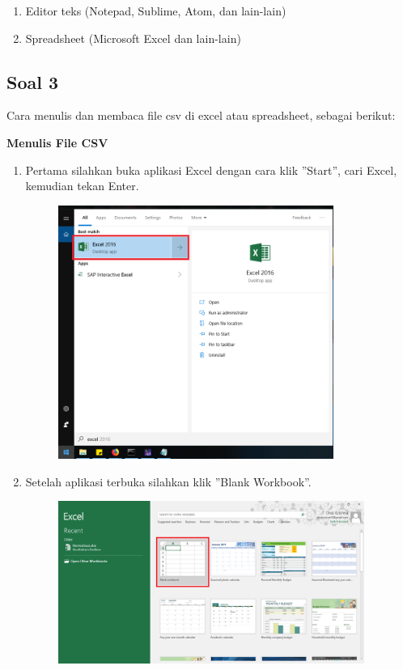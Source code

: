 \begin{enumerate}
	\item Editor teks (Notepad, Sublime, Atom, dan lain-lain)
	\item Spreadsheet (Microsoft Excel dan lain-lain)
\end{enumerate}

\subsection{Soal 3}
Cara menulis dan membaca file csv di excel atau spreadsheet, sebagai berikut:

\textbf{Menulis File CSV}

\begin{enumerate}
	\item Pertama silahkan buka aplikasi Excel dengan cara klik ''Start'', cari Excel, kemudian tekan Enter.
	
	\begin{figure}[H]
		\includegraphics[width=9cm]{figures/4/1174006/Teori/t1.png}
		\centering
	\end{figure}
	
	\item Setelah aplikasi terbuka silahkan klik ''Blank Workbook''.
	
	\begin{figure}[H]
		\includegraphics[width=10cm]{figures/4/1174006/Teori/t2.png}
		\centering
	\end{figure}
	

\end{enumerate}
